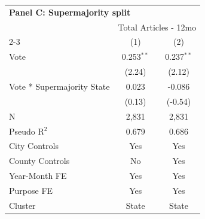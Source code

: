 \begingroup
\centering
\begin{tabular*}{\textwidth}{@{\extracolsep{\fill}}lcc}
\multicolumn{5}{l}{\textbf{Panel C: Supermajority split}}\\

\addlinespace
   \toprule
    & \multicolumn{2}{c}{Total Articles - 12mo}\\
   \cmidrule(lr){2-3}
                              & (1)          & (2)\\  
   \midrule 
   Vote                       & 0.253$^{**}$ & 0.237$^{**}$\\   
                              & (2.24)       & (2.12)\\   
   Vote * Supermajority State & 0.023        & -0.086\\   
                              & (0.13)      & (-0.54)\\   
   \hline
   N               & 2,831        & 2,831\\  
   Pseudo R$^2$               & 0.679        & 0.686\\  
   City Controls              & Yes           & Yes\\
   County Controls            & No            & Yes\\
   Year-Month FE              & Yes          & Yes\\  
   Purpose FE                 & Yes          & Yes\\  
   Cluster              & State & State\\  
   \bottomrule
\end{tabular*}
\par\endgroup
